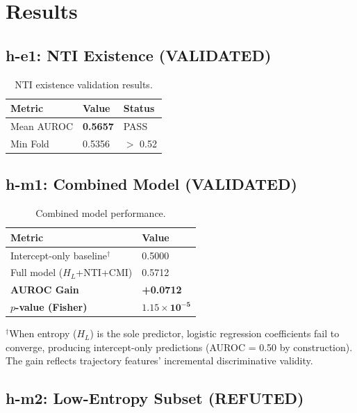 \section{Results}

\subsection{h-e1: NTI Existence (VALIDATED)}

\begin{table}[h]
\centering
\caption{NTI existence validation results.}
\label{tab:he1}
\begin{tabular}{@{}lll@{}}
\toprule
Metric & Value & Status \\
\midrule
Mean AUROC & \textbf{0.5657} & PASS \\
Min Fold & 0.5356 & $>$ 0.52 \\
\bottomrule
\end{tabular}
\end{table}

\subsection{h-m1: Combined Model (VALIDATED)}

\begin{table}[h]
\centering
\caption{Combined model performance.}
\label{tab:hm1}
\begin{tabular}{@{}ll@{}}
\toprule
Metric & Value \\
\midrule
Intercept-only baseline$^\dagger$ & 0.5000 \\
Full model ($H_L$+NTI+CMI) & 0.5712 \\
\textbf{AUROC Gain} & \textbf{+0.0712} \\
\textbf{$p$-value (Fisher)} & $\mathbf{1.15 \times 10^{-5}}$ \\
\bottomrule
\end{tabular}
\end{table}

$^\dagger$When entropy ($H_L$) is the sole predictor, logistic regression coefficients fail to converge, producing intercept-only predictions (AUROC = 0.50 by construction). The gain reflects trajectory features' incremental discriminative validity.

\subsection{h-m2: Low-Entropy Subset (REFUTED)}


